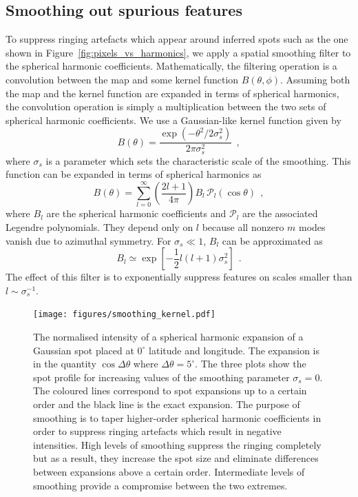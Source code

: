 \documentclass[12pt,dvipsnames]{report}
\newcommand{\hquad}{~~}
\begin{document}
\subsection{Smoothing out spurious features}
\label{ssec:spurious_features}
To suppress ringing artefacts which appear around inferred spots such as the one shown in Figure~\ref{fig:pixels_vs_harmonics}, we apply a spatial smoothing filter to the spherical harmonic coefficients.
Mathematically, the filtering operation is a convolution between the map and some kernel function $B(\theta,\phi)$.
Assuming both the map and the kernel function are expanded in terms of spherical harmonics, the convolution operation is simply a multiplication between the two sets of spherical harmonic coefficients.
We use a Gaussian-like kernel function given by
\begin{equation}
    B(\theta)=\frac{\exp \left(-\theta^{2} / 2 \sigma_s^{2}\right)}{2 \pi \sigma_s^{2}}
    \hquad,
\end{equation}
where $\sigma_s$ is a parameter which sets the characteristic scale of the smoothing.
This function can be expanded in terms of spherical harmonics as
\begin{equation}
    B(\theta)=\sum_{l=0}^{\infty}\left(\frac{2 l+1}{4 \pi}\right) B_{l} \,\mathcal{P}_{l}(\cos \theta)
    \hquad,
\end{equation}
where $B_l$ are the spherical harmonic coefficients and $\mathcal{P}_l$ are the associated Legendre polynomials.
They depend only on $l$ because all nonzero $m$ modes vanish due to azimuthal symmetry.
For $\sigma_s\ll 1$, $B_l$ can be approximated as 
\citep{2007astro.ph..3168S,1995ApJ...443....6W}
\begin{equation}
    B_l\simeq \exp\left[-\frac{1}{2}l(l+1)\sigma_s^2\right]
    \hquad.
\end{equation}
The effect of this filter is to exponentially suppress features on scales smaller than $l\sim \sigma_s^{-1}$.


\begin{figure}[t!]
    \begin{centering}
    \texttt{[image: figures/smoothing\_kernel.pdf]}
    \caption{
       The normalised intensity of a spherical harmonic expansion of 
        a Gaussian spot placed at $0^\circ$ latitude and longitude.
        The expansion is in the quantity $\cos\Delta\theta$ where $\Delta\theta=5^\circ$.
        The three plots show the spot profile for increasing values of the smoothing parameter 
    $\sigma_s=0$. 
        The coloured lines correspond to spot expansions up to a certain order and the black line is the exact expansion.
        The purpose of smoothing is to taper higher-order spherical harmonic coefficients in order to suppress ringing artefacts which result in negative intensities.
        High levels of smoothing suppress the ringing completely but as a result, they increase the spot size and eliminate differences between expansions above a certain order.
        Intermediate levels of smoothing provide a compromise between the two extremes.
    }
    \label{fig:smoothing_kernel}
    \end{centering}
\end{figure}
\end{document}
